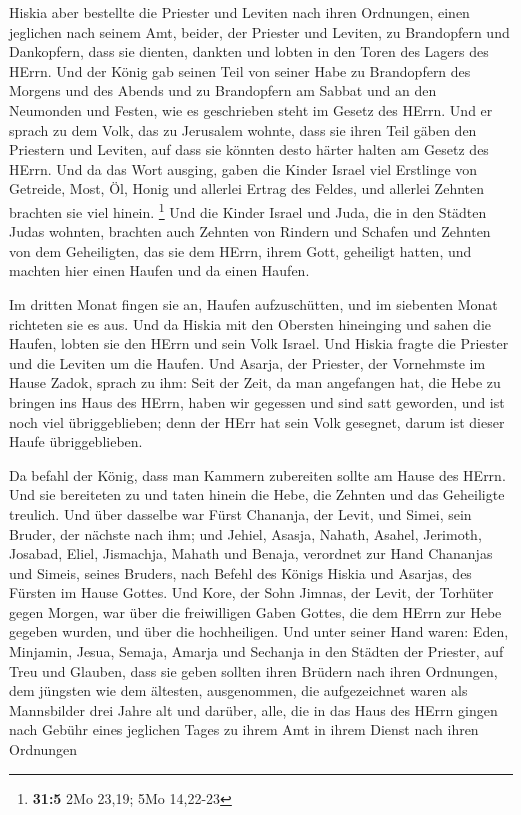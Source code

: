  Hiskia aber bestellte die Priester und Leviten nach ihren
Ordnungen, einen jeglichen nach seinem Amt, beider, der Priester und
Leviten, zu Brandopfern und Dankopfern, dass sie dienten, dankten und
lobten in den Toren des Lagers des HErrn.  Und der König
gab seinen Teil von seiner Habe zu Brandopfern des Morgens und des
Abends und zu Brandopfern am Sabbat und an den Neumonden und Festen, wie
es geschrieben steht im Gesetz des HErrn.  Und er sprach
zu dem Volk, das zu Jerusalem wohnte, dass sie ihren Teil gäben den
Priestern und Leviten, auf dass sie könnten desto härter halten am
Gesetz des HErrn.  Und da das Wort ausging, gaben die
Kinder Israel viel Erstlinge von Getreide, Most, Öl, Honig und allerlei
Ertrag des Feldes, und allerlei Zehnten brachten sie viel hinein.
\footnote{\textbf{31:5} 2Mo 23,19; 5Mo 14,22-23}  Und die
Kinder Israel und Juda, die in den Städten Judas wohnten, brachten auch
Zehnten von Rindern und Schafen und Zehnten von dem Geheiligten, das sie
dem HErrn, ihrem Gott, geheiligt hatten, und machten hier einen Haufen
und da einen Haufen.

 Im dritten Monat fingen sie an, Haufen aufzuschütten, und
im siebenten Monat richteten sie es aus.  Und da Hiskia
mit den Obersten hineinging und sahen die Haufen, lobten sie den HErrn
und sein Volk Israel.  Und Hiskia fragte die Priester und
die Leviten um die Haufen.  Und Asarja, der Priester, der
Vornehmste im Hause Zadok, sprach zu ihm: Seit der Zeit, da man
angefangen hat, die Hebe zu bringen ins Haus des HErrn, haben wir
gegessen und sind satt geworden, und ist noch viel übriggeblieben; denn
der HErr hat sein Volk gesegnet, darum ist dieser Haufe übriggeblieben.

 Da befahl der König, dass man Kammern zubereiten sollte
am Hause des HErrn. Und sie bereiteten zu  und taten
hinein die Hebe, die Zehnten und das Geheiligte treulich. Und über
dasselbe war Fürst Chananja, der Levit, und Simei, sein Bruder, der
nächste nach ihm;  und Jehiel, Asasja, Nahath, Asahel,
Jerimoth, Josabad, Eliel, Jismachja, Mahath und Benaja, verordnet zur
Hand Chananjas und Simeis, seines Bruders, nach Befehl des Königs Hiskia
und Asarjas, des Fürsten im Hause Gottes.  Und Kore, der
Sohn Jimnas, der Levit, der Torhüter gegen Morgen, war über die
freiwilligen Gaben Gottes, die dem HErrn zur Hebe gegeben wurden, und
über die hochheiligen.  Und unter seiner Hand waren:
Eden, Minjamin, Jesua, Semaja, Amarja und Sechanja in den Städten der
Priester, auf Treu und Glauben, dass sie geben sollten ihren Brüdern
nach ihren Ordnungen, dem jüngsten wie dem ältesten, 
ausgenommen, die aufgezeichnet waren als Mannsbilder drei Jahre alt und
darüber, alle, die in das Haus des HErrn gingen nach Gebühr eines
jeglichen Tages zu ihrem Amt in ihrem Dienst nach ihren Ordnungen

